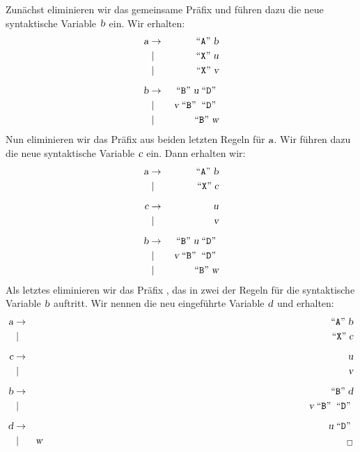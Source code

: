 \solution
Zunächst eliminieren wir das gemeinsame Präfix  und führen dazu die neue
syntaktische Variable $\textsl{b}$ ein.  Wir erhalten:
\begin{eqnarray*}
  \textsl{a} & \rightarrow & \;\mbox{``\texttt{A}''}\; \textsl{b}             \\
    & \mid        & \;\mbox{``\texttt{X}''}\; \textsl{u}             \\
    & \mid        & \;\mbox{``\texttt{X}''}\; \textsl{v}             \\[0.2cm]
  \textsl{b} & \rightarrow & \;\mbox{``\texttt{B}''}\; \textsl{u} \;\mbox{``\texttt{D}''}\;  \\
    & \mid        & \;\textsl{v} \;\mbox{``\texttt{B}''}\; \;\mbox{``\texttt{D}''}\;\\
    & \mid        & \;\mbox{``\texttt{B}''}\; \textsl{w}             
\end{eqnarray*}
Nun eliminieren wir das Präfix  aus beiden letzten Regeln für $\textsl{a}$.  Wir führen
dazu die neue syntaktische Variable $\textsl{c}$ ein. Dann erhalten wir:
\begin{eqnarray*}
  \textsl{a} & \rightarrow & \;\mbox{``\texttt{A}''}\; \textsl{b}              \\
    & \mid        & \;\mbox{``\texttt{X}''}\; \textsl{c}              \\[0.2cm]
  \textsl{c} & \rightarrow & \textsl{u}                         \\
    & \mid        & \textsl{v}                         \\[0.2cm]
  \textsl{b} & \rightarrow & \;\mbox{``\texttt{B}''}\; \textsl{u} \;\mbox{``\texttt{D}''}\;   \\
    & \mid        & \;\textsl{v} \;\mbox{``\texttt{B}''}\; \;\mbox{``\texttt{D}''}\; \\
    & \mid        & \;\mbox{``\texttt{B}''}\; \textsl{w}              
\end{eqnarray*}
Als letztes eliminieren wir das Präfix , das in zwei der Regeln für die
syntaktische Variable $\textsl{b}$ auftritt.  Wir nennen die neu eingeführte Variable $\textsl{d}$ und erhalten:
\begin{eqnarray*}
  \textsl{a} & \rightarrow & \quoted{A} \textsl{b}              \\
    & \mid        & \quoted{X} \textsl{c}              \\[0.2cm]
  \textsl{c} & \rightarrow & \textsl{u}                         \\
    & \mid        & \textsl{v}                         \\[0.2cm]
  \textsl{b} & \rightarrow & \quoted{B} \textsl{d}              \\
    & \mid        & \;\textsl{v} \quoted{B} \quoted{D} \\[0.2cm]
  \textsl{d} & \rightarrow & \textsl{u} \quoted{D}              \\
    & \mid        & \textsl{w}              \hspace*{11cm} _\Box
\end{eqnarray*}
\vspace*{0.3cm}


